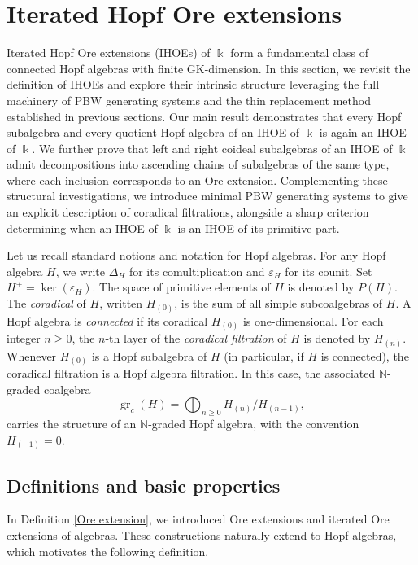 \documentclass{article}
\theoremstyle{plain}
\theoremstyle{definition}
\numberwithin{equation}{section}
\DeclareMathOperator{\gr}{gr}
\begin{document}
	
	\section{Iterated Hopf Ore extensions}
	\label{sec:IHOE-structure}
	
	Iterated Hopf Ore extensions (IHOEs) of $\Bbbk$ form a fundamental class of connected Hopf algebras with finite GK-dimension. In this section, we revisit the definition of IHOEs and explore their intrinsic structure leveraging the full machinery of PBW generating systems and the thin replacement method established in previous sections. Our main result demonstrates that every Hopf subalgebra and every quotient Hopf algebra of an IHOE of $\Bbbk$ is again an IHOE of $\Bbbk$. We further prove that left and right coideal subalgebras of an IHOE of $\Bbbk$ admit decompositions into ascending chains of subalgebras of the same type, where each inclusion corresponds to an Ore extension. Complementing these structural investigations, we introduce minimal PBW generating systems to give an explicit description of coradical filtrations, alongside a sharp criterion determining when an IHOE of $\Bbbk$ is an IHOE of its primitive part.
	
	Let us recall standard notions and notation for Hopf algebras. For any Hopf algebra $H$, we write $\Delta_{H}$ for its comultiplication and $\varepsilon_{H}$ for its counit. Set $H^{+} =\ker(\varepsilon_{H})$. The space of primitive elements of $H$ is denoted by $P(H)$. The \emph{coradical} of $H$, written $H_{(0)}$, is the sum of all simple subcoalgebras of $H$. A Hopf algebra is \emph{connected} if its coradical $H_{(0)}$ is one-dimensional. For each integer $n\geq 0$, the $n$-th layer of the \emph{coradical filtration} of $H$ is denoted by $H_{(n)}$. Whenever $H_{(0)}$ is a Hopf subalgebra of $H$ (in particular, if $H$ is connected), the coradical filtration is a Hopf algebra filtration. In this case, the associated $\mathbb{N}$-graded coalgebra
	\[
	\gr_{c}(H) = \bigoplus_{n\geq 0}H_{(n)}/H_{(n-1)},
	\]
	carries the structure of an $\mathbb{N}$-graded Hopf algebra, with the convention $H_{(-1)}=0$.
	
	\subsection{Definitions and basic properties}
	
	
	In Definition \ref{Ore extension}, we introduced Ore extensions and iterated Ore extensions of algebras. These constructions naturally extend to Hopf algebras, which motivates the following definition.
	
\end{document}
